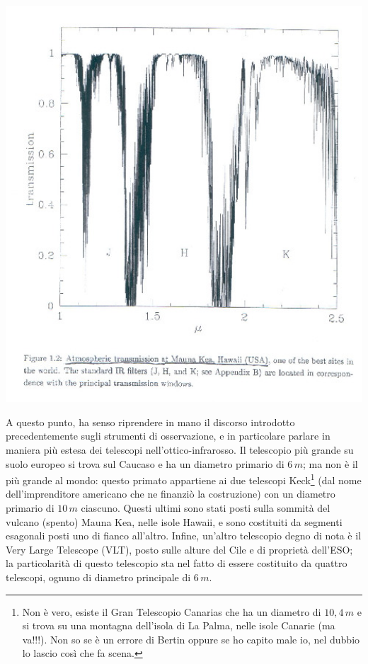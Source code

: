 \begin{minipage}{.45\textwidth}
	\centering
	\includegraphics[width=1\textwidth]{Img/bertin_4.png}
\end{minipage}

A questo punto, ha senso riprendere in mano il discorso introdotto precedentemente sugli strumenti di osservazione, e in particolare parlare in maniera più estesa dei telescopi nell'ottico-infrarosso. Il telescopio  più grande su suolo europeo si trova sul Caucaso e ha un diametro primario di $6 \, m$; ma non è il più grande al mondo: questo primato appartiene ai due telescopi Keck\footnote{Non è vero, esiste il Gran Telescopio Canarias che ha un diametro di $10,4 \, m$ e si trova su una montagna dell'isola di La Palma, nelle isole Canarie (ma va!!!). Non so se è un errore di Bertin oppure se ho capito male io, nel dubbio lo lascio così che fa scena.} (dal nome dell'imprenditore americano che ne finanziò la costruzione) con un diametro primario di $10 \, m$ ciascuno. Questi ultimi sono stati posti sulla sommità del vulcano (spento) Mauna Kea, nelle isole Hawaii, e sono costituiti da segmenti esagonali posti uno di fianco all'altro. Infine, un'altro telescopio degno di nota è il Very Large Telescope (VLT), posto sulle alture del Cile e di proprietà dell'ESO; la particolarità di questo telescopio sta nel fatto di essere costituito da quattro telescopi, ognuno di diametro principale di $6 \, m$.

